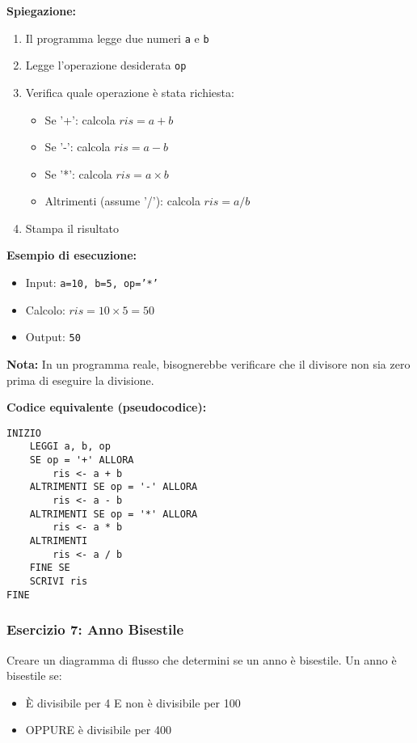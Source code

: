 \documentclass[a4paper,16pt]{article}
\begin{document}
\textbf{Spiegazione:}
\begin{enumerate}
    \item Il programma legge due numeri \texttt{a} e \texttt{b}
    \item Legge l'operazione desiderata \texttt{op}
    \item Verifica quale operazione è stata richiesta:
    \begin{itemize}
        \item Se '+': calcola $ris = a + b$
        \item Se '-': calcola $ris = a - b$
        \item Se '*': calcola $ris = a \times b$
        \item Altrimenti (assume '/'): calcola $ris = a / b$
    \end{itemize}
    \item Stampa il risultato
\end{enumerate}

\textbf{Esempio di esecuzione:}
\begin{itemize}
    \item Input: \texttt{a=10, b=5, op='*'}
    \item Calcolo: $ris = 10 \times 5 = 50$
    \item Output: \texttt{50}
\end{itemize}

\textbf{Nota:} In un programma reale, bisognerebbe verificare che il divisore non sia zero prima di eseguire la divisione.

\textbf{Codice equivalente (pseudocodice):}
\begin{lstlisting}
INIZIO
    LEGGI a, b, op
    SE op = '+' ALLORA
        ris <- a + b
    ALTRIMENTI SE op = '-' ALLORA
        ris <- a - b
    ALTRIMENTI SE op = '*' ALLORA
        ris <- a * b
    ALTRIMENTI
        ris <- a / b
    FINE SE
    SCRIVI ris
FINE
\end{lstlisting}

\newpage
\subsubsection{Esercizio 7: Anno Bisestile}

\begin{tcolorbox}[colback=blue!5!white,colframe=blue!75!black,title=Traccia]
Creare un diagramma di flusso che determini se un anno è bisestile. Un anno è bisestile se:
\begin{itemize}
    \item È divisibile per 4 E non è divisibile per 100
    \item OPPURE è divisibile per 400
\end{itemize}
\end{tcolorbox}
\end{document}
